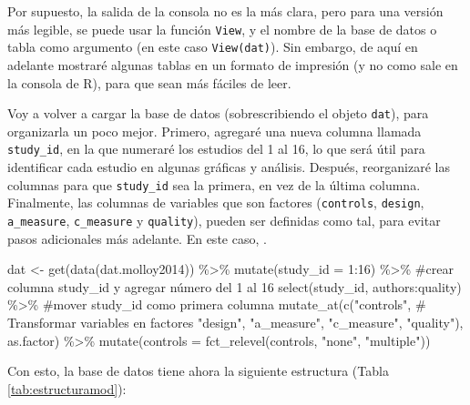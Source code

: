 \documentclass[
  bookmarksnumbered]{article}
\newenvironment{Shaded}{\begin{snugshade}}{\end{snugshade}}
\newcommand{\AttributeTok}[1]{\textcolor[rgb]{0.00,0.34,0.68}{#1}}
\newcommand{\CommentTok}[1]{\textcolor[rgb]{0.54,0.53,0.53}{#1}}
\newcommand{\DecValTok}[1]{\textcolor[rgb]{0.69,0.50,0.00}{#1}}
\newcommand{\FunctionTok}[1]{\textcolor[rgb]{0.39,0.29,0.61}{#1}}
\newcommand{\NormalTok}[1]{\textcolor[rgb]{0.12,0.11,0.11}{#1}}
\newcommand{\OtherTok}[1]{\textcolor[rgb]{0.00,0.43,0.16}{#1}}
\newcommand{\SpecialCharTok}[1]{\textcolor[rgb]{0.24,0.68,0.91}{#1}}
\newcommand{\StringTok}[1]{\textcolor[rgb]{0.75,0.01,0.01}{#1}}
\begin{document}
Por supuesto, la salida de la consola no es la más clara, pero para una versión más legible, se puede usar la función \texttt{View}, y el nombre de la base de datos o tabla como argumento (en este caso \texttt{View(dat)}). Sin embargo, de aquí en adelante mostraré algunas tablas en un formato de impresión (y no como sale en la consola de R), para que sean más fáciles de leer.

Voy a volver a cargar la base de datos (sobrescribiendo el objeto \texttt{dat}), para organizarla un poco mejor. Primero, agregaré una nueva columna llamada \texttt{study\_id}, en la que numeraré los estudios del 1 al 16, lo que será útil para identificar cada estudio en algunas gráficas y análisis. Después, reorganizaré las columnas para que \texttt{study\_id} sea la primera, en vez de la última columna. Finalmente, las columnas de variables que son factores (\texttt{controls}, \texttt{design}, \texttt{a\_measure}, \texttt{c\_measure} y \texttt{quality}), pueden ser definidas como tal, para evitar pasos adicionales más adelante. En este caso, .

\begin{Shaded}
\begin{Highlighting}[]
\NormalTok{dat }\OtherTok{\textless{}{-}} \FunctionTok{get}\NormalTok{(}\FunctionTok{data}\NormalTok{(dat.molloy2014)) }\SpecialCharTok{\%\textgreater{}\%}
  \FunctionTok{mutate}\NormalTok{(}\AttributeTok{study\_id =} \DecValTok{1}\SpecialCharTok{:}\DecValTok{16}\NormalTok{)  }\SpecialCharTok{\%\textgreater{}\%} \CommentTok{\#crear columna study\_id y agregar número del 1 al 16}
  \FunctionTok{select}\NormalTok{(study\_id, authors}\SpecialCharTok{:}\NormalTok{quality) }\SpecialCharTok{\%\textgreater{}\%} \CommentTok{\#mover study\_id como primera columna}
  \FunctionTok{mutate\_at}\NormalTok{(}\FunctionTok{c}\NormalTok{(}\StringTok{"controls"}\NormalTok{, }\CommentTok{\# Transformar variables en factores}
              \StringTok{"design"}\NormalTok{,}
              \StringTok{"a\_measure"}\NormalTok{,}
              \StringTok{"c\_measure"}\NormalTok{,}
              \StringTok{"quality"}\NormalTok{), }
\NormalTok{            as.factor) }\SpecialCharTok{\%\textgreater{}\%} 
  \FunctionTok{mutate}\NormalTok{(}\AttributeTok{controls =} \FunctionTok{fct\_relevel}\NormalTok{(controls, }\StringTok{"none"}\NormalTok{, }\StringTok{"multiple"}\NormalTok{))}
\end{Highlighting}
\end{Shaded}

Con esto, la base de datos tiene ahora la siguiente estructura (Tabla \ref{tab:estructuramod}):
\end{document}

